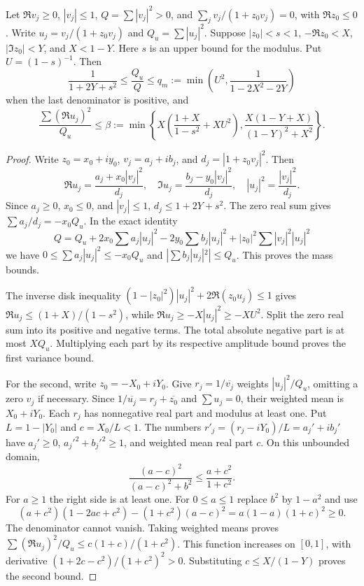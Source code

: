 \begin{lemma}\label{mf:saddle-variance}
Let $\Re v_j\ge0$, $|v_j|\le1$, $Q=\sum|v_j|^2>0$, and
$\sum_jv_j/(1+z_0v_j)=0$, with $\Re z_0\le0$.
Write $u_j=v_j/(1+z_0v_j)$ and $Q_u=\sum|u_j|^2$.
Suppose $|z_0|<s<1$, $-\Re z_0<X$, $|\Im z_0|<Y$,
and $X<1-Y$. Here $s$ is an upper bound for the modulus.
Put $U=(1-s)^{-1}$.
Then
\[
 \frac1{1+2Y+s^2}\le\frac{Q_u}{Q}
 \le q_m:=\min\left(U^2,\frac1{1-2X^2-2Y}\right)
\]
when the last denominator is positive, and
\[
 \frac{\sum(\Re u_j)^2}{Q_u}\le\beta
 :=\min\left\{
 X\left(\frac{1+X}{1-s^2}+XU^2\right),
 \frac{X(1-Y+X)}{(1-Y)^2+X^2}\right\}.
\]
\end{lemma}
\begin{proof}
Write $z_0=x_0+iy_0$, $v_j=a_j+ib_j$, and
$d_j=|1+z_0v_j|^2$. Then
\[
 \Re u_j=\frac{a_j+x_0|v_j|^2}{d_j},\quad
 \Im u_j=\frac{b_j-y_0|v_j|^2}{d_j},\quad
 |u_j|^2=\frac{|v_j|^2}{d_j}.
\]
Since $a_j\ge0$, $x_0\le0$, and $|v_j|\le1$,
$d_j\le1+2Y+s^2$. The zero real sum gives
$\sum a_j/d_j=-x_0Q_u$. In the exact identity
\[
 Q=Q_u+2x_0\sum a_j|u_j|^2
       -2y_0\sum b_j|u_j|^2
       +|z_0|^2\sum|v_j|^2|u_j|^2
\]
we have $0\le\sum a_j|u_j|^2\le-x_0Q_u$ and
$|\sum b_j|u_j|^2|\le Q_u$. This proves the mass bounds.

The inverse disk inequality
$(1-|z_0|^2)|u_j|^2+2\Re(z_0u_j)\le1$ gives
$\Re u_j\le(1+X)/(1-s^2)$, while
$\Re u_j\ge-X|u_j|^2\ge-XU^2$.
Split the zero real sum into its positive and negative terms.
The total absolute negative part is at most $XQ_u$. Multiplying
each part by its respective amplitude bound proves the first
variance bound.

For the second, write $z_0=-X_0+iY_0$. Give
$r_j=1/\overline{v_j}$ weights $|u_j|^2/Q_u$, omitting a
zero $v_j$ if necessary. Since
$1/\overline{u_j}=r_j+\overline{z_0}$ and $\sum u_j=0$,
their weighted mean is $X_0+iY_0$. Each $r_j$ has nonnegative
real part and modulus at least one. Put $L=1-|Y_0|$ and
$c=X_0/L<1$. The numbers
$r'_j=(r_j-iY_0)/L=a_j'+ib_j'$ have $a_j'\ge0$,
$a_j'^2+b_j'^2\ge1$, and weighted mean real part $c$.
On this unbounded domain,
\[
 \frac{(a-c)^2}{(a-c)^2+b^2}\le\frac{a+c^2}{1+c^2}.
\]
For $a\ge1$ the right side is at least one. For $0\le a\le1$
replace $b^2$ by $1-a^2$ and use
\[
 (a+c^2)(1-2ac+c^2)-(1+c^2)(a-c)^2
 =a(1-a)(1+c)^2\ge0.
\]
The denominator cannot vanish. Taking weighted means proves
$\sum(\Re u_j)^2/Q_u\le c(1+c)/(1+c^2)$.
This function increases on $[0,1]$, with derivative
$(1+2c-c^2)/(1+c^2)^2>0$. Substituting $c\le X/(1-Y)$
proves the second bound.
\end{proof}


